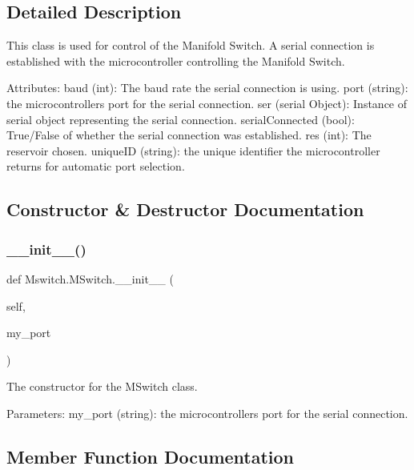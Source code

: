 \subsection{Detailed Description}
\begin{DoxyVerb}This class is used for control of the Manifold Switch. A serial connection is established with the microcontroller controlling the Manifold Switch.

Attributes:
    baud (int): The baud rate the serial connection is using.
    port (string): the microcontrollers port for the serial connection.
    ser (serial Object): Instance of serial object representing the serial connection.
    serialConnected (bool): True/False of whether the serial connection was established.
    res (int): The reservoir chosen.
    uniqueID (string): the unique identifier the microcontroller returns for automatic port selection.\end{DoxyVerb}
 

\subsection{Constructor \& Destructor Documentation}
\mbox{\label{class_mswitch_1_1_m_switch_a0fb0dfae18d749480c2f1951f8d33e7d}} 
\subsubsection{\texorpdfstring{\_\_init\_\_()}{\_\_init\_\_()}}
{\footnotesize\ttfamily def Mswitch.\+M\+Switch.\+\_\+\+\_\+init\+\_\+\+\_\+ (\begin{DoxyParamCaption}\item[{}]{self,  }\item[{}]{my\+\_\+port }\end{DoxyParamCaption})}

\begin{DoxyVerb}The constructor for the MSwitch class.

Parameters:
    my_port (string): the microcontrollers port for the serial connection.
\end{DoxyVerb}
 

\subsection{Member Function Documentation}
\mbox{\label{class_mswitch_1_1_m_switch_a7f9619b4aa0ad0e06121c6c52b13dca4}} 
